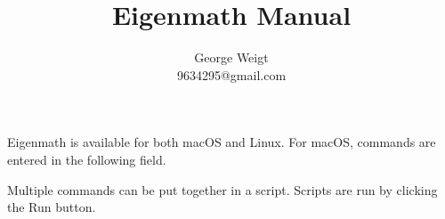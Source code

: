 \documentclass[12pt]{article}
\title{Eigenmath Manual}
\author{George Weigt\\9634295@gmail.com}
\begin{document}
\maketitle
\tableofcontents

\bigskip

Eigenmath is available for both macOS and Linux.
For macOS, commands are entered in the following field.

\begin{center}
\end{center}

Multiple commands can be put together in a script.
Scripts are run by clicking the Run button.

\begin{center}
\end{center}
\end{document}
